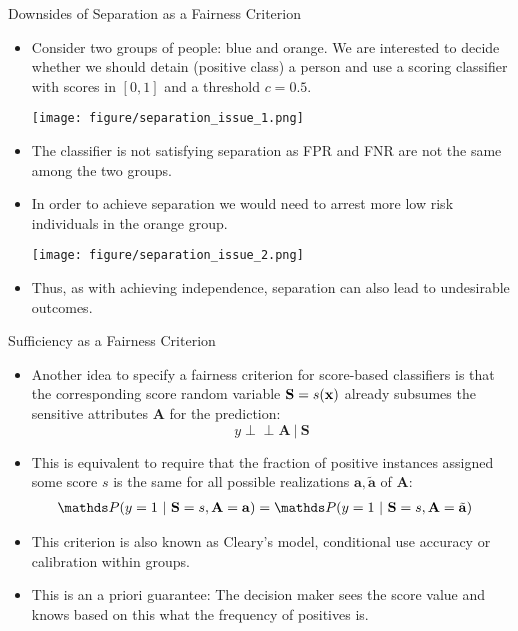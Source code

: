 \documentclass[11pt,compress,t,notes=noshow, xcolor=table]{beamer}
\newcommand{\sens}{\mathbf{A}} %
\newcommand{\ba}{\mathbf{a}}
\newcommand{\batilde}{\tilde{\mathbf{a}}}
\newcommand{\indep}{\perp \!\!\! \perp} %
\begin{document}
\begin{vbframe}{Downsides of Separation as a Fairness Criterion}
	\small{
		\begin{itemize}
			\item Consider two groups of people: blue and orange. We are interested to decide whether we should detain (positive class) a person and use a scoring classifier with scores in $[0,1]$ and a threshold $c=0.5.$
			
			\begin{center}
					\texttt{[image: figure/separation\_issue\_1.png]}
			\end{center}  
			\item The classifier is not satisfying separation as FPR and FNR are not the same among the two groups.
			\framebreak
%			
			\item In order to achieve separation we would need to arrest more low risk individuals in the orange group.
			\begin{center}
				\texttt{[image: figure/separation\_issue\_2.png]}
			\end{center}
			\item Thus, as with achieving independence, separation can also lead to undesirable outcomes.
%			
		\end{itemize}
	}
\end{vbframe}


\begin{vbframe}{Sufficiency as a Fairness Criterion}
	\small{
		\begin{itemize}
			\item Another idea to specify a fairness criterion for score-based classifiers is that the corresponding score random variable $\mathbf{S} = s(\mathbf{x})$ already subsumes the sensitive attributes $\sens$ for the prediction: 
			$$	y \indep \sens ~|~ 	\mathbf{S}$$
%			
			\item This is equivalent to require that the fraction of positive instances assigned some score $s$ is the same for   all possible realizations $\ba,\batilde$ of $\sens:$
			\begin{align*}
				&\P(  y = 1 ~|~ \mathbf{S} = s, \sens = \ba ) = \P(  y = 1 ~|~  \mathbf{S} = s, \sens = \batilde ) 
			\end{align*}
			\item This criterion is also known as Cleary's model, conditional use accuracy or calibration within groups.
			\item This is an a priori guarantee: The decision maker sees the score value and knows based on this what the frequency of positives is.
		\end{itemize}
	}
\end{vbframe}
\end{document}
